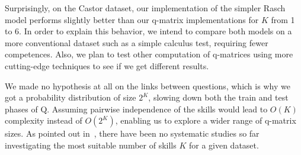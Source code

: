 \documentclass{edm_template}
\begin{document}


Surprisingly, on the Castor dataset, our implementation of the simpler Rasch model performs slightly better than our q-matrix implementations for $K$ from 1 to 6. In order to explain this behavior, we intend to compare both models on a more conventional dataset such as a simple calculus test, requiring fewer competences. Also, we plan to test other computation of q-matrices using more cutting-edge techniques to see if we get different results.




We made no hypothesis at all on the links between questions, which is why we got a probability distribution of size $2^K$, slowing down both the train and test phases of Q. Assuming pairwise independence of the skills would lead to $O(K)$ complexity instead of $O(2^K)$, enabling us to explore a wider range of q-matrix sizes. As pointed out in~\cite{Huebner2010}, there have been no systematic studies so far investigating the most suitable number of skills $K$ for a given dataset. %
\end{document}

